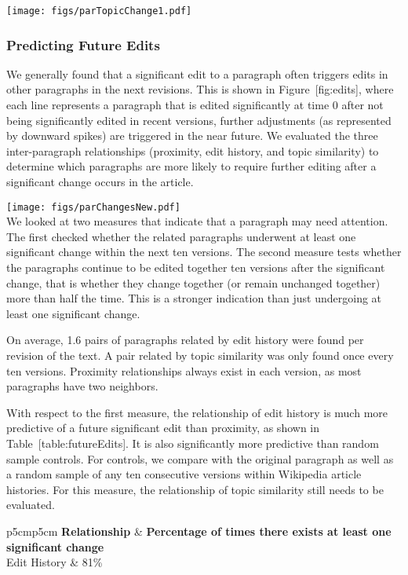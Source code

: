 \texttt{[image: figs/parTopicChange1.pdf]}\\

\subsubsection{Predicting Future Edits}\label{predicting-future-edits-1}

We generally found that a significant edit to a paragraph often triggers
edits in other paragraphs in the next revisions. This is shown in
Figure~{[}fig:edits{]}, where each line represents a paragraph that is
edited significantly at time 0 after not being significantly edited in
recent versions, further adjustments (as represented by downward spikes)
are triggered in the near future. We evaluated the three inter-paragraph
relationships (proximity, edit history, and topic similarity) to
determine which paragraphs are more likely to require further editing
after a significant change occurs in the article.

\texttt{[image: figs/parChangesNew.pdf]}\\

We looked at two measures that indicate that a paragraph may need
attention. The first checked whether the related paragraphs underwent at
least one significant change within the next ten versions. The second
measure tests whether the paragraphs continue to be edited together ten
versions after the significant change, that is whether they change
together (or remain unchanged together) more than half the time. This is
a stronger indication than just undergoing at least one significant
change.

On average, 1.6 pairs of paragraphs related by edit history were found
per revision of the text. A pair related by topic similarity was only
found once every ten versions. Proximity relationships always exist in
each version, as most paragraphs have two neighbors.

With respect to the first measure, the relationship of edit history is
much more predictive of a future significant edit than proximity, as
shown in Table~{[}table:futureEdits{]}. It is also significantly more
predictive than random sample controls. For controls, we compare with
the original paragraph as well as a random sample of any ten consecutive
versions within Wikipedia article histories. For this measure, the
relationship of topic similarity still needs to be evaluated.

{\textbar{}p{5cm}\textbar{}p{5cm}\textbar{}} \textbf{Relationship} \&
\textbf{Percentage of times there exists at least one significant
change}\\Edit History \& 81\%\\

